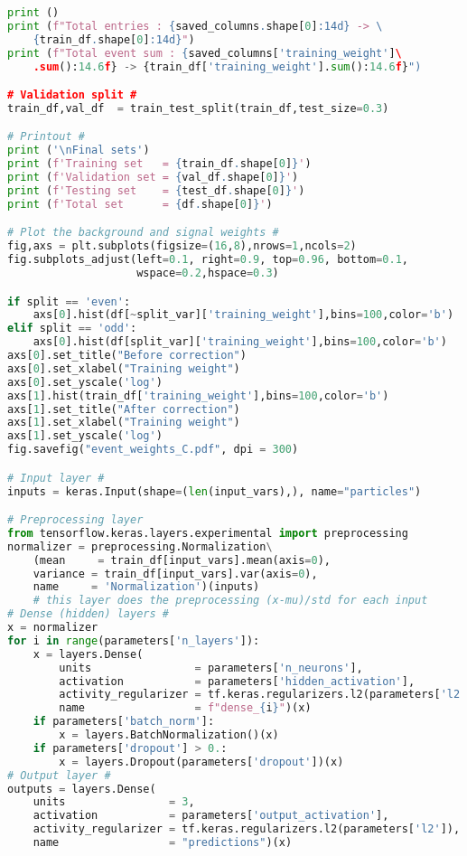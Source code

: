 \begin{lstlisting}[language=Python, caption=Python module of the analysis used in Bamboo framework, label={dnncode}]
print ()
print (f"Total entries : {saved_columns.shape[0]:14d} -> \
    {train_df.shape[0]:14d}")
print (f"Total event sum : {saved_columns['training_weight']\
    .sum():14.6f} -> {train_df['training_weight'].sum():14.6f}")

# Validation split #
train_df,val_df  = train_test_split(train_df,test_size=0.3)

# Printout #
print ('\nFinal sets')
print (f'Training set   = {train_df.shape[0]}')
print (f'Validation set = {val_df.shape[0]}')
print (f'Testing set    = {test_df.shape[0]}')
print (f'Total set      = {df.shape[0]}')

# Plot the background and signal weights #
fig,axs = plt.subplots(figsize=(16,8),nrows=1,ncols=2)
fig.subplots_adjust(left=0.1, right=0.9, top=0.96, bottom=0.1,
                    wspace=0.2,hspace=0.3)

if split == 'even':
    axs[0].hist(df[~split_var]['training_weight'],bins=100,color='b')
elif split == 'odd':
    axs[0].hist(df[split_var]['training_weight'],bins=100,color='b')
axs[0].set_title("Before correction")
axs[0].set_xlabel("Training weight")
axs[0].set_yscale('log')
axs[1].hist(train_df['training_weight'],bins=100,color='b')
axs[1].set_title("After correction")
axs[1].set_xlabel("Training weight")
axs[1].set_yscale('log')
fig.savefig("event_weights_C.pdf", dpi = 300)

# Input layer #
inputs = keras.Input(shape=(len(input_vars),), name="particles")

# Preprocessing layer
from tensorflow.keras.layers.experimental import preprocessing
normalizer = preprocessing.Normalization\
    (mean     = train_df[input_vars].mean(axis=0),
    variance = train_df[input_vars].var(axis=0),
    name     = 'Normalization')(inputs)
    # this layer does the preprocessing (x-mu)/std for each input
# Dense (hidden) layers #
x = normalizer
for i in range(parameters['n_layers']):
    x = layers.Dense(
        units                = parameters['n_neurons'], 
        activation           = parameters['hidden_activation'], 
        activity_regularizer = tf.keras.regularizers.l2(parameters['l2']),
        name                 = f"dense_{i}")(x)
    if parameters['batch_norm']:
        x = layers.BatchNormalization()(x)
    if parameters['dropout'] > 0.:
        x = layers.Dropout(parameters['dropout'])(x)
# Output layer #
outputs = layers.Dense(
    units                = 3, 
    activation           = parameters['output_activation'],
    activity_regularizer = tf.keras.regularizers.l2(parameters['l2']),
    name                 = "predictions")(x)


\end{lstlisting}

